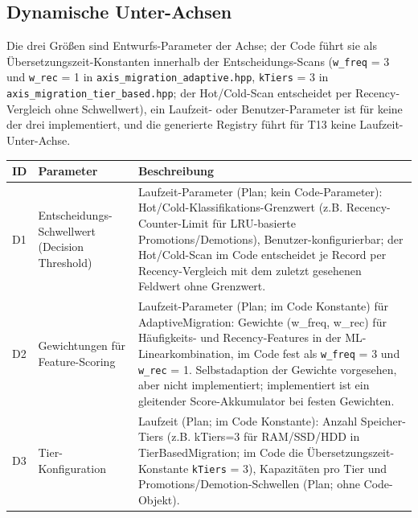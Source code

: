 \subsection*{Dynamische Unter-Achsen}

Die drei Größen sind Entwurfs-Parameter der Achse; der Code führt sie als Übersetzungszeit-Konstanten innerhalb der Entscheidungs-Scans (\texttt{w\_\allowbreak{}freq} = 3 und \texttt{w\_\allowbreak{}rec} = 1 in \texttt{axis\_\allowbreak{}migration\_\allowbreak{}adaptive.hpp}, \texttt{k\allowbreak{}Tiers} = 3 in \texttt{axis\_\allowbreak{}migration\_\allowbreak{}tier\_\allowbreak{}based.hpp}; der Hot/\allowbreak{}Cold-Scan entscheidet per Recency-Vergleich ohne Schwellwert), ein Laufzeit- oder Benutzer-Parameter ist für keine der drei implementiert, und die generierte Registry führt für T13 keine Laufzeit-Unter-Achse.

\begin{scriptsize}
\begin{longtable}{@{}>{\raggedright\arraybackslash}p{1.8cm} >{\raggedright\arraybackslash}p{3.2cm} >{\raggedright\arraybackslash}p{8.5cm}@{}}
\toprule
ID & Parameter & Beschreibung \\
\midrule
\endhead%
D1 & Entscheidungs-Schwellwert (Decision Threshold) & Laufzeit-Parameter (Plan; kein Code-Parameter): Hot/\allowbreak{}Cold-Klassifikations-Grenzwert (z.B. Recency-Counter-Limit für LRU-basierte Promotions/\allowbreak{}Demotions), Benutzer-konfigurierbar; der Hot/\allowbreak{}Cold-Scan im Code entscheidet je Record per Recency-Vergleich mit dem zuletzt gesehenen Feldwert ohne Grenzwert. \\
D2 & Gewichtungen für Feature-Scoring & Laufzeit-Parameter (Plan; im Code Konstante) für Adaptive\allowbreak{}Migration: Gewichte (w\_\allowbreak{}freq, w\_\allowbreak{}rec) für Häufigkeits- und Recency-Features in der ML-Linearkombination, im Code fest als \texttt{w\_\allowbreak{}freq} = 3 und \texttt{w\_\allowbreak{}rec} = 1. Selbstadaption der Gewichte vorgesehen, aber nicht implementiert; implementiert ist ein gleitender Score-Akkumulator bei festen Gewichten. \\
D3 & Tier-Konfiguration & Laufzeit (Plan; im Code Konstante): Anzahl Speicher-Tiers (z.B. k\allowbreak{}Tiers=3 für RAM/\allowbreak{}SSD/\allowbreak{}HDD in Tier\allowbreak{}Based\allowbreak{}Migration; im Code die Übersetzungszeit-Konstante \texttt{k\allowbreak{}Tiers} = 3), Kapazitäten pro Tier und Promotions/\allowbreak{}Demotion-Schwellen (Plan; ohne Code-Objekt). \\
\bottomrule
\end{longtable}
\end{scriptsize}

